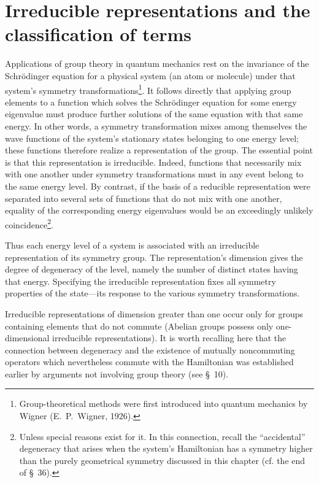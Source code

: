 \section{Irreducible representations and the classification of terms}

Applications of group theory in quantum mechanics rest on the invariance of the Schr\"odinger equation for a physical system (an atom or molecule) under that system's symmetry transformations\footnote{Group-theoretical methods were first introduced into quantum mechanics by Wigner (E.~P.~Wigner, 1926).}. It follows directly that applying group elements to a function which solves the Schr\"odinger equation for some energy eigenvalue must produce further solutions of the same equation with that same energy. In other words, a symmetry transformation mixes among themselves the wave functions of the system's stationary states belonging to one energy level; these functions therefore realize a representation of the group. The essential point is that this representation is irreducible. Indeed, functions that necessarily mix with one another under symmetry transformations must in any event belong to the same energy level. By contrast, if the basis of a reducible%
%
representation were separated into several sets of functions that do not mix with one another, equality of the corresponding energy eigenvalues would be an exceedingly unlikely coincidence\footnote{Unless special reasons exist for it. In this connection, recall the ``accidental'' degeneracy that arises when the system's Hamiltonian has a symmetry higher than the purely geometrical symmetry discussed in this chapter (cf. the end of \S~36).}.

Thus each energy level of a system is associated with an irreducible representation of its symmetry group. The representation's dimension gives the degree of degeneracy of the level, namely the number of distinct states having that energy. Specifying the irreducible representation fixes all symmetry properties of the state---its response to the various symmetry transformations.

Irreducible representations of dimension greater than one occur only for groups containing elements that do not commute (Abelian groups possess only one-dimensional irreducible representations). It is worth recalling here that the connection between degeneracy and the existence of mutually noncommuting operators which nevertheless commute with the Hamiltonian was established earlier by arguments not involving group theory (see \S~10).

